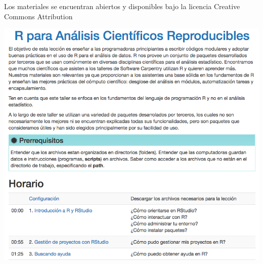 \documentclass[ignorenonframetext,]{beamer}
\begin{document}

\begin{frame}{Los materiales se encuentran abiertos y disponibles bajo
la licencia Creative Commons Attribution}
\protect\hypertarget{los-materiales-se-encuentran-abiertos-y-disponibles-bajo-la-licencia-creative-commons-attribution}{}

\includegraphics{../figures/10_talk/R-gapminder-es.png}

\end{frame}
\end{document}
